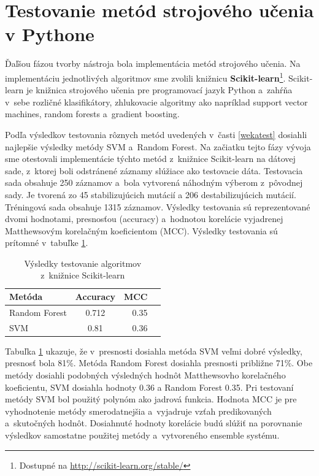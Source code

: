 \section{Testovanie metód strojového učenia v Pythone}

Ďaľšou fázou tvorby nástroja bola implementácia metód strojového učenia. Na implementáciu jednotlivých algoritmov sme zvolili knižnicu \textbf{Scikit-learn}\footnote{Dostupné na \url{http://scikit-learn.org/stable/}}. Scikit-learn je knižnica strojového učenia pre programovací jazyk Python a~zahŕňa v~sebe rozličné klasifikátory, zhlukovacie algoritmy ako napríklad support vector machines, random forests a~gradient boosting.

Podľa výsledkov testovania rôznych metód uvedených v~časti \ref{wekatest} dosiahli najlepšie výsledky metódy SVM a~Random Forest. Na začiatku tejto fázy vývoja sme otestovali implementácie týchto metód z~knižnice Scikit-learn na dátovej sade, z~ktorej boli odstránené záznamy slúžiace ako testovacie dáta. Testovacia sada obsahuje 250 záznamov a~bola vytvorená náhodným výberom z~pôvodnej sady. Je tvorená zo 45 stabilizujúcich mutácií a 206 destabilizujúcich mutácií. Tréningová sada obsahuje 1315 záznamov. Výsledky testovania sú reprezentované dvomi hodnotami, presnosťou (accuracy) a~hodnotou korelácie vyjadrenej Matthewsovým korelačným koeficientom (MCC). Výsledky testovania sú prítomné v~tabuľke \ref{scikittest}.
\begin{table}[H]
	\centering
	\begin{tabular}{ | l | c | r | l| }
		\hline 
		Metóda  & Accuracy & MCC \\ \hline
		Random Forest & 0.712 & 0.35\\ \hline
		SVM & 0.81 & 0.36 \\\hline
	\end{tabular}
	\caption {Výsledky testovanie algoritmov z~knižnice Scikit-learn} \label{scikittest} 
\end{table}

Tabuľka \ref{scikittest} ukazuje, že v~presnosti dosiahla metóda SVM veľmi dobré výsledky, presnosť bola 81\%. Metóda Random Forest dosiahla presnosti približne 71\%. Obe metódy dosiahli podobných výsledných hodnôt Matthewsovho korelačného koeficientu, SVM dosiahla hodnoty 0.36 a Random Forest 0.35. Pri testovaní metódy SVM bol použitý polynóm ako jadrová funkcia. Hodnota MCC je pre vyhodnotenie metódy smerodatnejšia a~vyjadruje vzťah predikovaných a~skutočných hodnôt. Dosiahnuté hodnoty korelácie budú slúžiť na porovnanie výsledkov samostatne použitej metódy a~vytvoreného ensemble systému.

